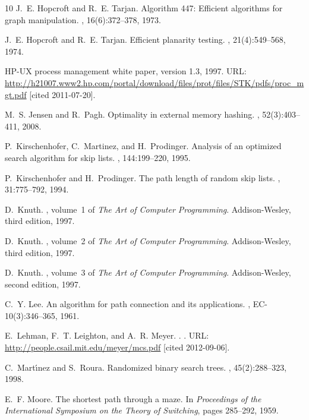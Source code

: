 \documentclass[10pt]{book}
\theoremstyle{plain}
\theoremstyle{definition}
\begin{document}
\begin{thebibliography}{10}
J.~E. Hopcroft and R.~E. Tarjan.
\newblock Algorithm 447: Efficient algorithms for graph manipulation.
, 16(6):372--378, 1973.

J.~E. Hopcroft and R.~E. Tarjan.
\newblock Efficient planarity testing.
, 21(4):549--568, 1974.

{HP-UX} process management white paper, version 1.3, 1997.
\newblock URL:
  \url{http://h21007.www2.hp.com/portal/download/files/prot/files/STK/pdfs/proc_mgt.pdf}
  [cited 2011-07-20].

M.~S. Jensen and R.~Pagh.
\newblock Optimality in external memory hashing.
, 52(3):403--411, 2008.

P.~Kirschenhofer, C.~Martinez, and H.~Prodinger.
\newblock Analysis of an optimized search algorithm for skip lists.
, 144:199--220, 1995.

P.~Kirschenhofer and H.~Prodinger.
\newblock The path length of random skip lists.
, 31:775--792, 1994.

D.~Knuth.
, volume~1 of {\em The Art of Computer
  Programming}.
\newblock Addison-Wesley, third edition, 1997.

D.~Knuth.
, volume~2 of {\em The Art of Computer
  Programming}.
\newblock Addison-Wesley, third edition, 1997.

D.~Knuth.
, volume~3 of {\em The Art of Computer
  Programming}.
\newblock Addison-Wesley, second edition, 1997.

C.~Y. Lee.
\newblock An algorithm for path connection and its applications.
, EC-10(3):346--365,
  1961.

E.~Lehman, F.~T. Leighton, and A.~R. Meyer.
.
.
\newblock URL: \url{http://people.csail.mit.edu/meyer/mcs.pdf} [cited
  2012-09-06].

C.~Mart\'{\i}nez and S.~Roura.
\newblock Randomized binary search trees.
, 45(2):288--323, 1998.

E.~F. Moore.
\newblock The shortest path through a maze.
\newblock In {\em Proceedings of the International Symposium on the Theory of
  Switching}, pages 285--292, 1959.


\end{thebibliography}
\end{document}

